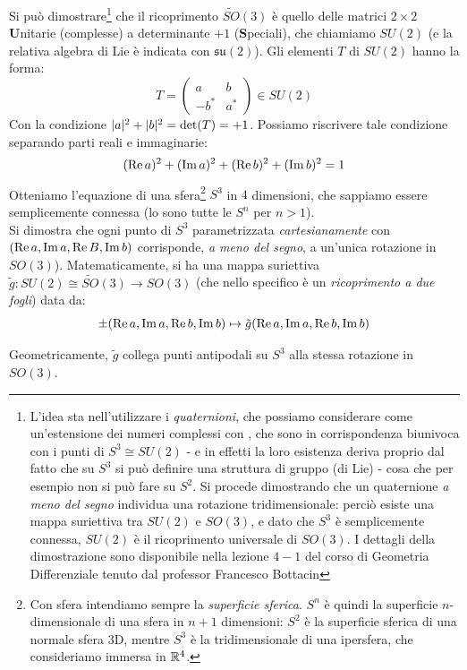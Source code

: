 \documentclass[../../FisicaTeorica.tex]{subfiles}
\begin{document}
Si può dimostrare\footnote{L'idea sta nell'utilizzare i \textit{quaternioni}, che possiamo considerare come un'estensione dei numeri complessi con , che sono in corrispondenza biunivoca con i punti di $S^3 \cong SU(2)$ - e in effetti la loro esistenza deriva proprio dal fatto che su $S^3$ si può definire una struttura di gruppo (di Lie) - cosa che per esempio non si può fare su $S^2$. Si procede dimostrando che un quaternione \textit{a meno del segno} individua una rotazione tridimensionale: perciò esiste una mappa suriettiva tra $SU(2)$ e $SO(3)$, e dato che $S^3$ è semplicemente connessa, $SU(2)$ è il ricoprimento universale di $SO(3)$. I dettagli della dimostrazione sono disponibile nella lezione $4-1$ del corso di Geometria Differenziale tenuto dal professor Francesco Bottacin} che il ricoprimento $\widetilde{SO}(3)$ è quello delle matrici $2\times 2$ \textbf{U}nitarie (complesse) a determinante $+1$ (\textbf{S}peciali), che chiamiamo $SU(2)$ (e la relativa algebra di Lie è indicata con $\mathfrak{su}(2)$). Gli elementi $T$ di $SU(2)$ hanno la forma:
\[
T =
\begin{pmatrix}
a & b\\
-b^* & a^*
\end{pmatrix} \in SU(2)
\]
Con la condizione $|a|^2 + |b|^2 = \operatorname{det}(T) = +1$. Possiamo riscrivere tale condizione separando parti reali e immaginarie:
\[
(\operatorname{Re} a)^2 + (\operatorname{Im} a)^2 + (\operatorname{Re} b)^2 + (\operatorname{Im} b)^2 = 1
\]
Otteniamo l'equazione di una sfera\footnote{Con sfera intendiamo sempre la \textit{superficie sferica}. $S^n$ è quindi la superficie $n$-dimensionale di una sfera in $n+1$ dimensioni: $S^2$ è la superficie sferica di una normale sfera 3D, mentre $S^3$ è la  tridimensionale di una ipersfera, che consideriamo immersa in $\mathbb{R}^4$.} $S^3$ in $4$ dimensioni, che sappiamo essere semplicemente connessa (lo sono tutte le $S^n$ per $n>1$).\\

Si dimostra che ogni punto di $S^3$ parametrizzata \textit{cartesianamente} con $(\operatorname{Re}a, \operatorname{Im}a, \operatorname{Re}B, \operatorname{Im}b)$ corrisponde, \textit{a meno del segno}, a un'unica rotazione in $SO(3)$). Matematicamente, si ha una mappa suriettiva $\tilde{g}: SU(2) \cong \tilde{SO}(3) \to SO(3)$ (che nello specifico è un \textit{ricoprimento a due fogli}) data da:
\[
\pm (\operatorname{Re}a, \operatorname{Im}a, \operatorname{Re}b, \operatorname{Im}b) \mapsto \tilde{g}(\operatorname{Re}a, \operatorname{Im}a, \operatorname{Re}b, \operatorname{Im}b)
\]

Geometricamente, $\tilde{g}$ collega punti antipodali su $S^3$ alla stessa rotazione in $SO(3)$.\\
\end{document}
